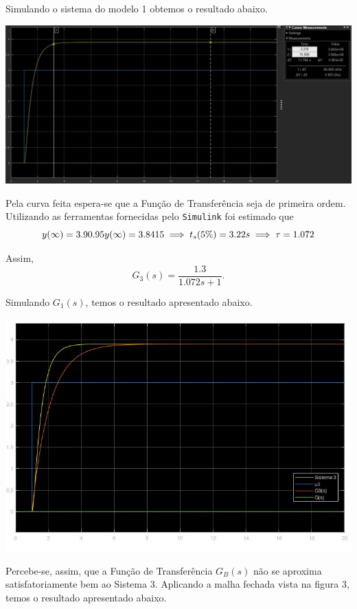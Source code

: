 \documentclass[
]{book}
\begin{document}
Simulando o sistema do modelo 1 obtemos o resultado abaixo.

\includegraphics{Imagens/Lab3/Resolução/prob3AA.jpg}

Pela curva feita espera-se que a Função de Transferência seja de primeira ordem. Utilizando as ferramentas fornecidas pelo \texttt{Simulink} foi estimado que
\[
y(\infty) = 3.9 \\
0.95y(\infty) = 3.8415 \implies  t_s(5\%) = 3.22s \implies \tau = 1.072
\]

Assim,
\[
G_3(s) = \frac {1.3}{1.072s+1}.
\]

Simulando \(G_1(s)\), temos o resultado apresentado abaixo.

\includegraphics{Imagens/Lab3/Resolução/prob3AB.jpg}

Percebe-se, assim, que a Função de Transferência \(G_B(s)\) não se aproxima satisfatoriamente bem ao Sistema 3. Aplicando a malha fechada vista na figura 3, temos o resultado apresentado abaixo.
\end{document}
